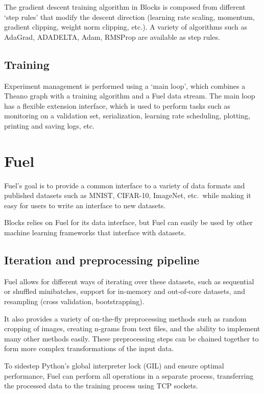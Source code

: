 \documentclass[twoside,11pt]{article}
\begin{document}
The gradient descent training algorithm in Blocks is composed from different
`step rules' that modify the descent direction (learning rate scaling,
momentum, gradient clipping, weight norm clipping, etc.). A variety of
algorithms such as AdaGrad, ADADELTA, Adam, RMSProp are available as step
rules.

\subsection{Training}

Experiment management is performed using a `main loop', which combines a Theano
graph with a training algorithm and a Fuel data stream. The main loop has a
flexible extension interface, which is used to perform tasks such as monitoring
on a validation set, serialization, learning rate scheduling, plotting, printing
and saving logs, etc.

\section{Fuel}

Fuel's goal is to provide a common interface to a variety of data formats and
published datasets such as MNIST, CIFAR-10, ImageNet, etc.\ while making it easy
for users to write an interface to new datasets.

Blocks relies on Fuel for its data interface, but Fuel can easily be used by
other machine learning frameworks that interface with datasets.

\subsection{Iteration and preprocessing pipeline}

Fuel allows for different ways of iterating over these datasets, such as
sequential or shuffled minibatches, support for in-memory and out-of-core
datasets, and resampling (cross validation, bootstrapping).

It also provides a variety of on-the-fly preprocessing methods such as random
cropping of images, creating n-grams from text files, and the ability to
implement many other methods easily. These preprocessing steps can be
chained together to form more complex transformations of the input data.

To sidestep Python's global interpreter lock (GIL) and ensure optimal
performance, Fuel can perform all operations in a separate process,
transferring the processed data to the training process using TCP sockets.
\end{document}
